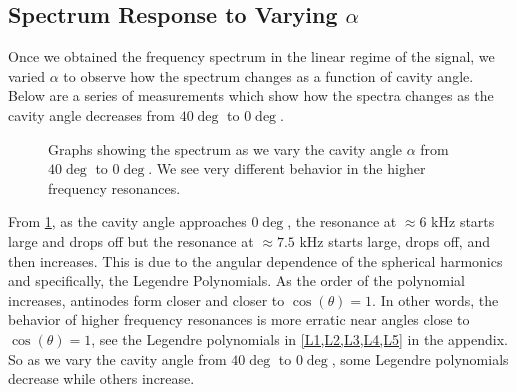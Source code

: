 \documentclass[12pt]{article}
\begin{document}
	\subsection{Spectrum Response to Varying $\alpha$}
	Once we obtained the frequency spectrum in the linear regime of the signal, we varied $\alpha$ to observe how the spectrum changes as a function of cavity angle. Below are a series of measurements which show how the spectra changes as the cavity angle decreases from $40\deg$ to $0\deg$.
	
	\begin{figure}[H]
		\centering
		\quad
		\quad
		\caption{Graphs showing the spectrum as we vary the cavity angle $\alpha$ from $40\deg$ to $0\deg$. We see very different behavior in the higher frequency resonances.}
		\label{angleSpectra}
	\end{figure}

	From \cref{angleSpectra}, as the cavity angle approaches $0\deg$, the resonance at $\approx6$ kHz starts large and drops off but the resonance at $\approx7.5$ kHz starts large, drops off, and then increases. This is due to the angular dependence of the spherical harmonics and specifically, the Legendre Polynomials. As the order of the polynomial increases, antinodes form closer and closer to $\cos(\theta) = 1$. In other words, the behavior of higher frequency resonances is more erratic near angles close to $\cos(\theta) = 1$, see the Legendre polynomials in \cref{L1,L2,L3,L4,L5} in the appendix. So as we vary the cavity angle from $40\deg$ to $0\deg$, some Legendre polynomials decrease while others increase.
\end{document}
